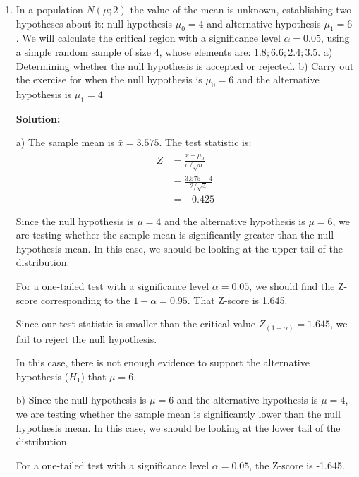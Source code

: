 \documentclass[12pt]{article}
\begin{document}
\begin{enumerate}
{\noindent We observe that $\hat{\theta}_{1}$ has a lower variance in comparison to $\hat{\theta}_{2}$, therefore it is more efficient.

}

\item   In a population $N(\mu ; 2)$ the value of the mean is unknown, establishing two hypotheses about it: null hypothesis $\mu_0=4$ and alternative hypothesis $\mu_1=6$. We will calculate the critical region with a significance level $\alpha=0.05$, using a simple random sample of size 4, whose elements are: $1.8 ; 6.6 ; 2.4 ; 3.5$.\newline
a) Determining whether the null hypothesis is accepted or rejected.\newline
b) Carry out the exercise for when the null hypothesis is $\mu_0=6$ and the alternative hypothesis is $\mu_1=4$\medskip

{\color{blue}
\noindent \textbf{Solution:}

a) The sample mean is $\bar{x}=3.575$. The test statistic is:
\begin{align*}
	Z &= \frac{\bar{x} - \mu_0}{\sigma / \sqrt{n}} \\
	&= \frac{3.575 - 4}{2 / \sqrt{4}} \\
	&= -0.425
\end{align*}

Since the null hypothesis is $\mu = 4$ and the alternative hypothesis is $\mu = 6$, we are testing whether the sample mean is significantly greater than the null hypothesis mean. In this case, we should be looking at the upper tail of the distribution.\medskip

For a one-tailed test with a significance level $\alpha=0.05$, we should find the Z-score corresponding to the $1 - \alpha = 0.95$. That Z-score is 1.645.\medskip

Since our test statistic is smaller than the critical value $Z_{(1-\alpha)} = 1.645$, we fail to reject the null hypothesis.\medskip

In this case, there is not enough evidence to support the alternative hypothesis ($H_1$) that $\mu = 6$.

b) Since the null hypothesis is $\mu = 6$ and the alternative hypothesis is $\mu = 4$, we are testing whether the sample mean is significantly lower than the null hypothesis mean. In this case, we should be looking at the lower tail of the distribution.\medskip

For a one-tailed test with a significance level $\alpha=0.05$, the Z-score is -1.645.\medskip

}
\end{enumerate}
\end{document}
